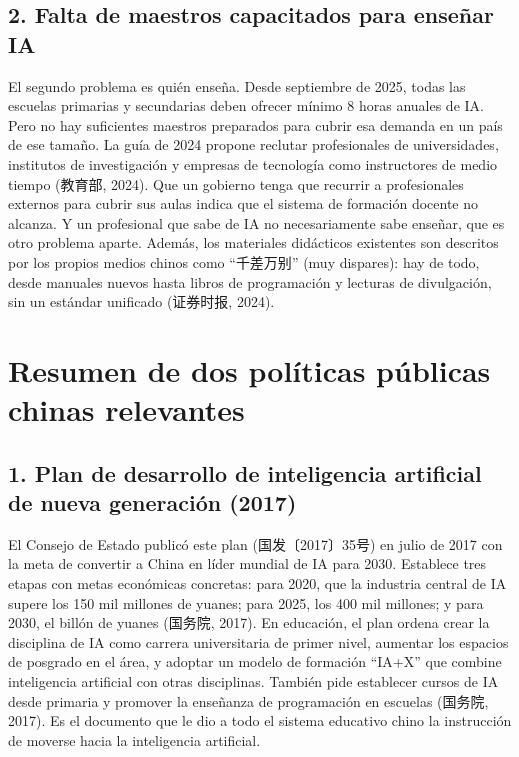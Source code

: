 \documentclass[12pt,a4paper]{article}
\newcommand{\zh}[1]{{\cjkfont #1}}
\begin{document}
\subsection*{2. Falta de maestros capacitados para enseñar IA}

El segundo problema es quién enseña. Desde septiembre de 2025, todas las escuelas primarias y secundarias deben ofrecer mínimo 8 horas anuales de IA. Pero no hay suficientes maestros preparados para cubrir esa demanda en un país de ese tamaño. La guía de 2024 propone reclutar profesionales de universidades, institutos de investigación y empresas de tecnología como instructores de medio tiempo (\zh{教育部}, 2024). Que un gobierno tenga que recurrir a profesionales externos para cubrir sus aulas indica que el sistema de formación docente no alcanza. Y un profesional que sabe de IA no necesariamente sabe enseñar, que es otro problema aparte. Además, los materiales didácticos existentes son descritos por los propios medios chinos como ``\zh{千差万别}'' (muy dispares): hay de todo, desde manuales nuevos hasta libros de programación y lecturas de divulgación, sin un estándar unificado (\zh{证券时报}, 2024).

\section*{Resumen de dos políticas públicas chinas relevantes}

\subsection*{1. Plan de desarrollo de inteligencia artificial de nueva generación (2017)}

El Consejo de Estado publicó este plan (\zh{国发〔2017〕35号}) en julio de 2017 con la meta de convertir a China en líder mundial de IA para 2030. Establece tres etapas con metas económicas concretas: para 2020, que la industria central de IA supere los 150 mil millones de yuanes; para 2025, los 400 mil millones; y para 2030, el billón de yuanes (\zh{国务院}, 2017). En educación, el plan ordena crear la disciplina de IA como carrera universitaria de primer nivel, aumentar los espacios de posgrado en el área, y adoptar un modelo de formación ``IA+X'' que combine inteligencia artificial con otras disciplinas. También pide establecer cursos de IA desde primaria y promover la enseñanza de programación en escuelas (\zh{国务院}, 2017). Es el documento que le dio a todo el sistema educativo chino la instrucción de moverse hacia la inteligencia artificial.
\end{document}
